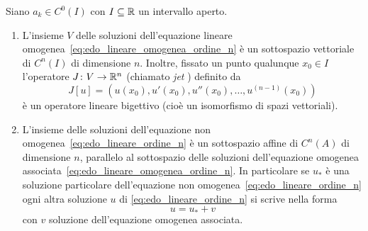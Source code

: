 \begin{theorem}%
\label{th:edo_lineare_ordine_n}%
\mymark{***}%
Siano $a_k\in C^0(I)$ con $I\subseteq {\mathbb R}$
un intervallo aperto.

\begin{enumerate}
\item
L'insieme $V$ delle soluzioni dell'equazione lineare omogenea~\eqref{eq:edo_lineare_omogenea_ordine_n}
è un sottospazio vettoriale di $C^n(I)$ di dimensione $n$.
Inoltre, fissato un punto qualunque $x_0\in I$ l'operatore $J\colon V \to {\mathbb R}^n$
(chiamato \emph{jet}%
) definito da
\begin{equation}\label{eq:jet}
  J[u] = (u(x_0), u'(x_0), u''(x_0), \dots, u^{(n-1)}(x_0))
\end{equation}
è un operatore lineare bigettivo (cioè un isomorfismo di spazi vettoriali).

\item
L'insieme delle soluzioni dell'equazione non omogenea~\eqref{eq:edo_lineare_ordine_n}
è un sottospazio affine di $C^n(A)$ di dimensione $n$,
parallelo al sottospazio delle soluzioni dell'equazione omogenea
associata~\eqref{eq:edo_lineare_omogenea_ordine_n}.
In particolare se $u_*$ è una soluzione particolare dell'equazione non
omogenea~\eqref{eq:edo_lineare_ordine_n} ogni altra soluzione $u$ di
\eqref{eq:edo_lineare_ordine_n} si scrive nella forma
\[
  u = u_* + v
\]
con $v$ soluzione dell'equazione omogenea associata.
\end{enumerate}
\end{theorem}
%
